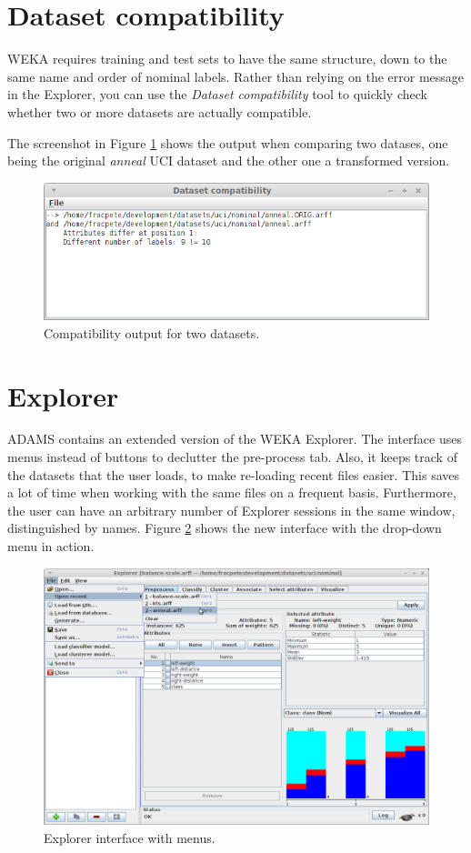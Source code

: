 \clearpage
\section{Dataset compatibility}

WEKA requires training and test sets to have the same structure, down to the
same name and order of nominal labels. Rather than relying on the error message
in the Explorer, you can use the \textit{Dataset compatibility} tool to 
quickly check whether two or more datasets are actually compatible.

The screenshot in Figure \ref{dataset-compatibility} shows the output when
comparing two datases, one being the original \textit{anneal} UCI dataset
and the other one a transformed version.

\begin{figure}[htb]
  \centering
  \includegraphics[width=12.0cm]{images/dataset-compatibility.png}
  \caption{Compatibility output for two datasets.}
  \label{dataset-compatibility}
\end{figure}

\clearpage
\section{Explorer}
ADAMS contains an extended version of the WEKA Explorer. The interface uses
menus instead of buttons to declutter the pre-process tab. Also, it keeps track
of the datasets that the user loads, to make re-loading recent files easier.
This saves a lot of time when working with the same files on a frequent basis.
Furthermore, the user can have an arbitrary number of Explorer sessions in the
same window, distinguished by names. Figure \ref{explorerext} shows the new
interface with the drop-down menu in action.

\begin{figure}[htb]
  \centering
  \includegraphics[width=12.0cm]{images/explorerext.png}
  \caption{Explorer interface with menus.}
  \label{explorerext}
\end{figure}

